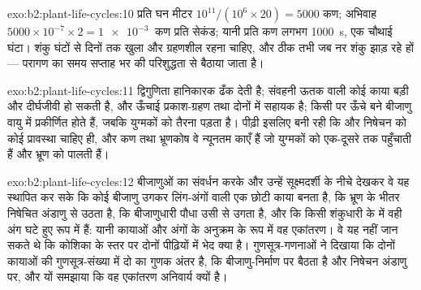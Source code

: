 \begin{solution}{exo:b2:plant-life-cycles:10}
प्रति घन मीटर $10^{11}/(10^{6}\times 20) = \num{5000}$ कण; अभिवाह
$5000\times 10^{-7}\times 2 = \qty{1e-3}{}$ कण प्रति सेकंड; यानी प्रति
कण लगभग \qty{1000}{s}, एक चौथाई घंटा। शंकु घंटों से दिनों तक खुला और
ग्रहणशील रहना चाहिए, और ठीक तभी जब नर शंकु झाड़ रहे हों --- परागण का
समय सप्ताह भर की परिशुद्धता से बैठाया जाता है।
\end{solution}

\begin{solution}{exo:b2:plant-life-cycles:11}
द्विगुणिता  हानिकारक  ढँक देती है; संवहनी ऊतक वाली
कोई  काया बड़ी और दीर्घजीवी हो सकती है, और ऊँचाई प्रकाश-ग्रहण
तथा  दोनों में सहायक है; किसी  पर ऊँचे बने
बीजाणु वायु में प्रकीर्णित होते हैं, जबकि युग्मकों को तैरना पड़ता है।
 पीढ़ी इसलिए बनी रही कि  और निषेचन को कोई
 प्रावस्था चाहिए ही, और  कण तथा भ्रूणकोष वे न्यूनतम काएँ हैं
जो युग्मकों को एक-दूसरे तक पहुँचाती हैं और भ्रूण को पालती हैं।
\end{solution}

\begin{solution}{exo:b2:plant-life-cycles:12}
बीजाणुओं का संवर्धन करके और उन्हें सूक्ष्मदर्शी के नीचे देखकर वे यह
स्थापित कर सके कि कोई बीजाणु उगकर लिंग-अंगों वाली एक छोटी काया बनता है,
कि भ्रूण  के भीतर निषेचित अंडाणु से उठता है,
कि बीजाणुधारी पौधा उसी से उगता है, और
कि किसी शंकुधारी के  में वही अंग घटे हुए रूप में हैं: यानी
कायाओं और अंगों के अनुक्रम के रूप में वह एकांतरण। वे यह नहीं जान सकते थे
कि कोशिका के स्तर पर दोनों पीढ़ियों में भेद क्या है।
गुणसूत्र-गणनाओं ने दिखाया कि दोनों कायाओं की गुणसूत्र-संख्या में दो का
गुणक अंतर है, कि  बीजाणु-निर्माण पर बैठता है और
निषेचन अंडाणु पर, और यों समझाया कि वह एकांतरण अनिवार्य क्यों है।
\end{solution}

